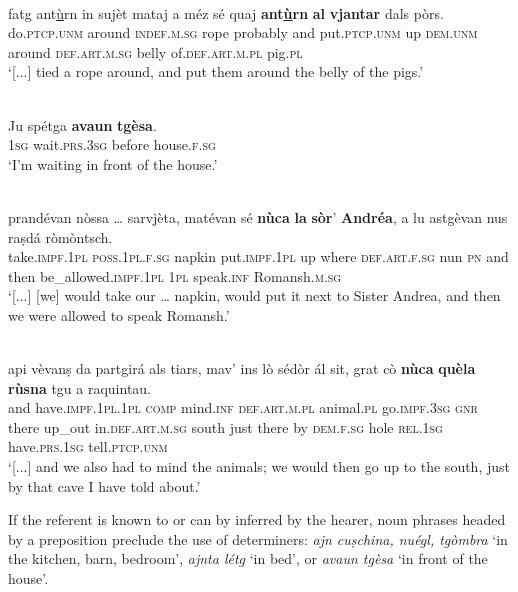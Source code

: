 \ea
\label{}
\\
\gll    [...] fatg ant\underline{ù}rn in sujèt mataj a méz sé quaj \textbf{ant\underline{ù}rn} \textbf{al} \textbf{vjantar} dals pòrs.\\
{} do.\textsc{ptcp.unm} around \textsc{indef.m.sg} rope probably and put.\textsc{ptcp.unm} up  \textsc{dem.unm} around \textsc{def.art.m.sg} belly of.\textsc{def.art.m.pl} pig.\textsc{pl} \\
\glt `[...] tied a rope around, and put them around the belly of the pigs.'
\z

\ea
\label{}
\\
\gll Ju spétga \textbf{avaun} \textbf{tgèsa}.\\
\textsc{1sg} wait\textsc{.prs.3sg} before house.\textsc{f.sg}\\
\glt `I'm waiting in front of the house.'
\z

\ea
\label{}
\\
\gll [...] prandévan nòssa … sarvjèta, matévan sé \textbf{nùca} \textbf{la} \textbf{sòr}’ \textbf{Andréa}, a lu astgèvan nus raṣdá ròmòntsch.\\
{} take.\textsc{impf.1pl} \textsc{poss.1pl.f.sg} {} napkin put.\textsc{impf.1pl} up  where \textsc{def.art.f.sg} nun \textsc{pn} and then be\_allowed.\textsc{impf.1pl} \textsc{1pl} speak.\textsc{inf} Romansh.\textsc{m.sg}\\
\glt `[...] [we] would take our … napkin, would put it next to Sister Andrea, and then we were allowed to speak Romansh.'
\z

\ea
\label{}
\\
\gll [...] api vèvanṣ da partgirá als tiars, mav’ ins lò sédòr ál sit, grat cò \textbf{nùca} \textbf{quèla} \textbf{rùsna} tgu a raquintau.\\
{} and have.\textsc{impf.1pl.1pl} \textsc{comp} mind.\textsc{inf} \textsc{def.art.m.pl} animal.\textsc{pl} go.\textsc{impf.3sg} \textsc{gnr} there up\_out in.\textsc{def.art.m.sg} south just there by \textsc{dem.f.sg} hole \textsc{rel.1sg} have.\textsc{prs.1sg} tell.\textsc{ptcp.unm}\\  
\glt `[...] and we also had to mind the animals; we would then go up to the south, just by that cave I have told about.'
\z

If the referent is known to or can by inferred by the hearer, noun phrases headed by a preposition preclude the use of determiners: \textit{ajn cuṣchina, nuégl, tgòmbra} `in the kitchen, barn, bedroom', \textit{ajnta létg} `in bed', or \textit{avaun tgèsa} `in front of the house'.


